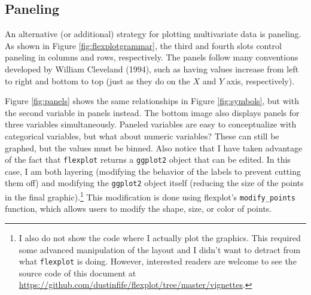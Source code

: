 \documentclass[
  english,
  man]{apa6}
\begin{document}
\hypertarget{paneling}{%
\subsection{Paneling}\label{paneling}}

An alternative (or additional) strategy for plotting multivariate data is paneling. As shown in Figure \ref{fig:flexplotgrammar}, the third and fourth slots control paneling in columns and rows, respectively. The panels follow many conventions developed by William Cleveland (1994), such as having values increase from left to right and bottom to top (just as they do on the \(X\) and \(Y\) axis, respectively).

Figure \ref{fig:panels} shows the same relationships in Figure \ref{fig:symbols}, but with the second variable in panels instead. The bottom image also displays panels for three variables simultaneously. Paneled variables are easy to conceptualize with categorical variables, but what about numeric variables? These can still be graphed, but the values must be binned. Also notice that I have taken advantage of the fact that \texttt{flexplot} returns a \texttt{ggplot2} object that can be edited. In this case, I am both layering (modifying the behavior of the labels to prevent cutting them off) and modifying the \texttt{ggplot2} object itself (reducing the size of the points in the final graphic).\footnote{I also do not show the code where I actually plot the graphics. This required some advanced manipulation of the layout and I didn't want to detract from what \texttt{flexplot} is doing. However, interested readers are welcome to see the source code of this document at \url{https://github.com/dustinfife/flexplot/tree/master/vignettes}.} This modification is done using flexplot's \texttt{modify\_points} function, which allows users to modify the shape, size, or color of points.

\small
\end{document}
